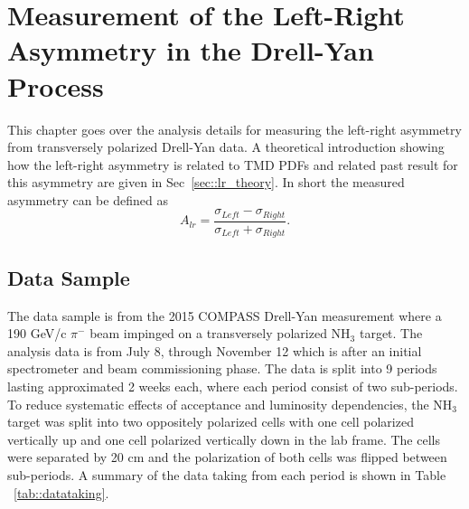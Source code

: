 \chapter{Measurement of the Left-Right Asymmetry in the Drell-Yan Process} 
\label{ch::leftright}
\ifpdf
\graphicspath{{Chapters/LeftRight/Figs/}}
\fi

This chapter goes over the analysis details for measuring the left-right
asymmetry from transversely polarized Drell-Yan data.  A theoretical
introduction showing how the left-right asymmetry is related to TMD PDFs and
related past result for this asymmetry are given in Sec~\ref{sec::lr_theory}.
In short the measured asymmetry can be defined as
\begin{equation}
  A_{lr} = \frac{\sigma_{Left} - \sigma_{Right}}{\sigma_{Left} +
    \sigma_{Right}}.
\end{equation}


\section{Data Sample} \label{sec::datasample}
The data sample is from the 2015 COMPASS Drell-Yan measurement where a 190 GeV/c
$\pi^-$ beam impinged on a transversely polarized NH$_3$ target.  The analysis
data is from July 8, through November 12 which is after an initial spectrometer
and beam commissioning phase.  The data is split into 9 periods lasting
approximated 2 weeks each, where each period consist of two sub-periods.  To
reduce systematic effects of acceptance and luminosity dependencies, the NH$_3$
target was split into two oppositely polarized cells with one cell polarized
vertically up and one cell polarized vertically down in the lab frame.  The
cells were separated by 20 cm and the polarization of both cells was flipped
between sub-periods.  A summary of the data taking from each period is shown in
Table ~\ref{tab::datataking}.

